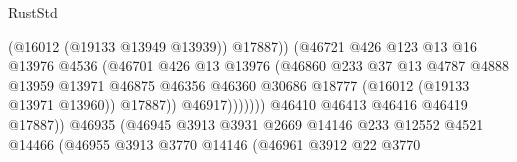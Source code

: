 \begin{lexlean}{RustStd}
\begin{coremodule}
                                                  (@16012 (@19133 @13949 @13939))
                                                  @17887))
                                              (@46721
                                                @426
                                                @123
                                                @13
                                                @16
                                                @13976
                                                @4536
                                                (@46701
                                                  @426
                                                  @13
                                                  @13976
                                                  (@46860
                                                    @233
                                                    @37
                                                    @13
                                                    @4787
                                                    @4888
                                                    @13959
                                                    @13971
                                                    @46875
                                                    @46356
                                                    @46360
                                                    @30686
                                                    @18777
                                                    (@16012 (@19133 @13971 @13960))
                                                    @17887))
                                                @46917)))))))
                                  @46410
                                  @46413
                                  @46416
                                  @46419
                                  @17887))
                              @46935
                              (@46945
                                @3913
                                @3931
                                @2669
                                @14146
                                @233
                                @12552
                                @4521
                                @14466
                                (@46955
                                  @3913
                                  @3770
                                  @14146
                                  (@46961
                                    @3912
                                    @22
                                    @3770

\end{coremodule}
\end{lexlean}
